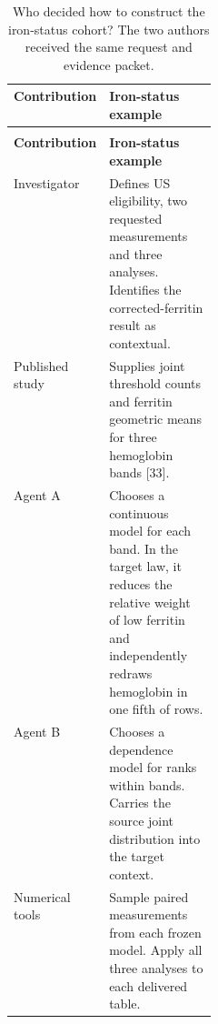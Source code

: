 \documentclass[11pt,letterpaper]{article}
\begin{document}
\FloatBarrier

\begingroup

\small

\renewcommand{\arraystretch}{1.22}

\begin{xltabular}{\linewidth}{@{}>{\raggedright\arraybackslash}p{0.26\linewidth}>{\raggedright\arraybackslash}X@{}}

\caption{Who decided how to construct the iron-status cohort? The two authors received the same request and evidence packet.}\label{tab:2} \\

\toprule

\textbf{Contribution} & \textbf{Iron-status example} \\

\midrule

\endfirsthead

\\

\toprule

\textbf{Contribution} & \textbf{Iron-status example} \\

\midrule

\endhead

\bottomrule

\endfoot

Investigator & Defines US eligibility, two requested measurements and three analyses. Identifies the corrected-ferritin result as contextual. \\

Published study & Supplies joint threshold counts and ferritin geometric means for three hemoglobin bands [33]. \\

Agent A & Chooses a continuous model for each band. In the target law, it reduces the relative weight of low ferritin and independently redraws hemoglobin in one fifth of rows. \\

Agent B & Chooses a dependence model for ranks within bands. Carries the source joint distribution into the target context. \\

Numerical tools & Sample paired measurements from each frozen model. Apply all three analyses to each delivered table. \\

\end{xltabular}
\end{document}
